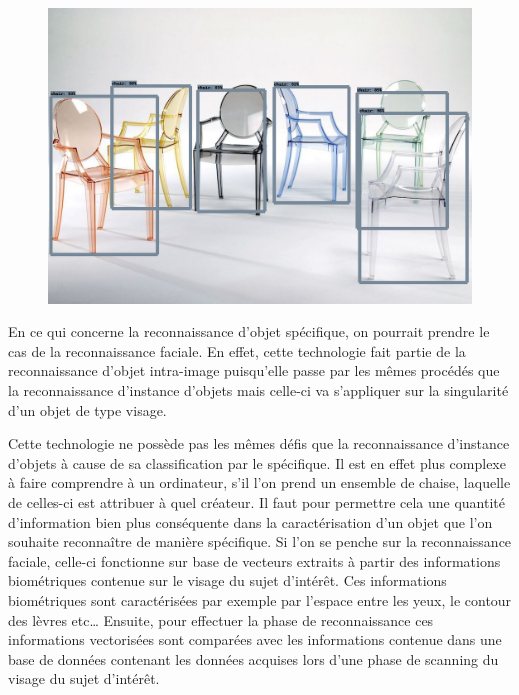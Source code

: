 \documentclass[a4paper,12pt]{article} %
\begin{document}
\newline
\begin{figure}[h] %
  \centering %
  \includegraphics[scale=0.2]{output.png} %
\end{figure}
\newpage
\par
En ce qui concerne la reconnaissance d’objet spécifique, on pourrait prendre le cas de la reconnaissance faciale. En effet, cette technologie fait partie de la reconnaissance d’objet intra-image puisqu’elle passe par les mêmes procédés que la reconnaissance d’instance d’objets mais celle-ci va s’appliquer sur la singularité d’un objet de type visage. 
\newline
\par
Cette technologie ne possède pas les mêmes défis que la reconnaissance d’instance d’objets à cause de sa classification par le spécifique. Il est en effet plus complexe à faire comprendre à un ordinateur, s’il l’on prend un ensemble de chaise, laquelle de celles-ci est attribuer à quel créateur. Il faut pour permettre cela une quantité d’information bien plus conséquente dans la caractérisation d’un objet que l’on souhaite reconnaître de manière spécifique. Si l’on se penche sur la reconnaissance faciale, celle-ci fonctionne sur base de vecteurs extraits à partir des informations biométriques contenue sur le visage du sujet d’intérêt. Ces informations biométriques sont caractérisées par exemple par l’espace entre les yeux, le contour des lèvres etc… Ensuite, pour effectuer la phase de reconnaissance ces informations vectorisées sont comparées avec les informations contenue dans une base de données contenant les données acquises lors d’une phase de scanning du visage du sujet d’intérêt. 
\end{document}
